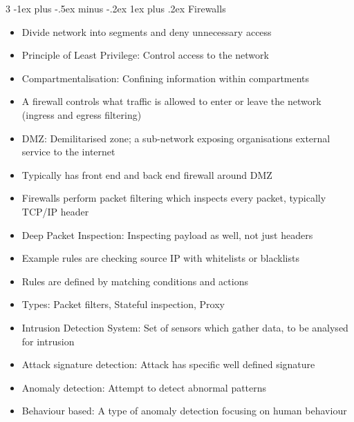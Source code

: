 \documentclass[10pt, landscape]{article}
\makeatletter
\renewcommand{\subsection}{\@startsection{subsection}{3}{0mm}%
                                {-1ex plus -.5ex minus -.2ex}%
                                {1ex plus .2ex}%
                                {\normalfont\small\bfseries}}%
\makeatother
\begin{document}
\begin{multicols*}{3}
\subsection{Firewalls}
\begin{itemize}
    \item Divide network into segments and deny unnecessary access
    \item Principle of Least Privilege: Control access to the network
    \item Compartmentalisation: Confining information within compartments
    \item A firewall controls what traffic is allowed to enter or leave the network (ingress and egress filtering)
    \item DMZ: Demilitarised zone; a sub-network exposing organisations external service to the internet
    \item Typically has front end and back end firewall around DMZ
    \item Firewalls perform packet filtering which inspects every packet, typically TCP/IP header
    \item Deep Packet Inspection: Inspecting payload as well, not just headers
    \item Example rules are checking source IP with whitelists or blacklists
    \item Rules are defined by matching conditions and actions
    \item Types: Packet filters, Stateful inspection, Proxy
    \item Intrusion Detection System: Set of sensors which gather data, to be analysed for intrusion
    \item Attack signature detection: Attack has specific well defined signature
    \item Anomaly detection: Attempt to detect abnormal patterns
    \item Behaviour based: A type of anomaly detection focusing on human behaviour
\end{itemize}


\end{multicols*}
\end{document}
